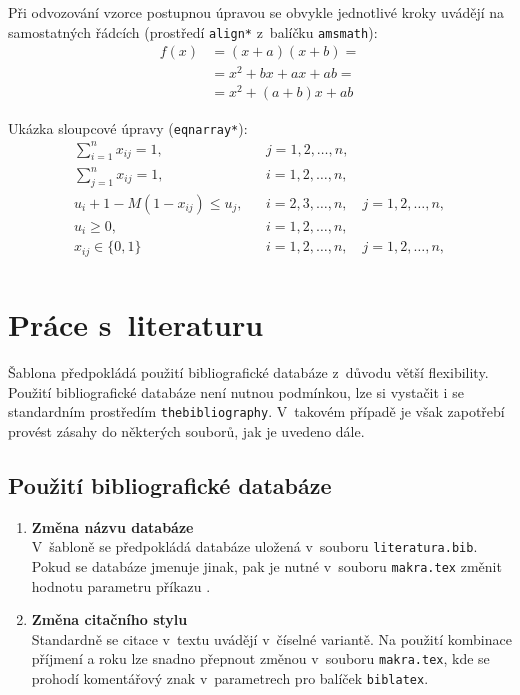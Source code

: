 Při odvozování vzorce postupnou úpravou se obvykle jednotlivé kroky uvádějí na samostatných řádcích (prostředí \verb'align*' z~balíčku \verb|amsmath|):
\begin{align*}
 f(x) &= (x+a)(x+b) =\\
      &= x^2 + bx + ax + ab =\\
      &= x^2 + (a+b)x + ab
\end{align*}

Ukázka sloupcové úpravy (\verb|eqnarray*|):
\begin{eqnarray*}
\sum_{i=1}^n x_{ij} =1, && j=1,2,\dots,n,\\
\sum_{j=1}^n x_{ij} =1, && i=1,2,\dots,n,\\
u_i + 1 - M(1 - x_{ij}) \le u_j, && i=2,3,\dots,n,\quad j=1,2,\dots,n,\\
u_i \ge 0,              && i=1,2,\dots,n,\\
x_{ij} \in \{0,1\} && i=1,2,\dots,n,\quad j=1,2,\dots,n,\\
\end{eqnarray*}


\chapter{Práce s~literaturu}

Šablona předpokládá použití bibliografické databáze z~důvodu větší flexibility. Použití bibliografické databáze není nutnou podmínkou, lze si vystačit i se standardním prostředím \texttt{thebibliography}. V~takovém případě je však zapotřebí provést zásahy do některých souborů, jak je uvedeno dále.

\section{Použití bibliografické databáze}

\begin{enumerate}
\item\textbf{Změna názvu databáze}\\
V~šabloně se předpokládá databáze uložená v~souboru \texttt{literatura.bib}. Pokud se databáze jmenuje jinak, pak je nutné v~souboru \texttt{makra.tex} změnit hodnotu parametru příkazu \verb''.
\item\textbf{Změna citačního stylu}\\
Standardně se citace v~textu uvádějí v~číselné variantě. Na použití kombinace příjmení a roku lze snadno přepnout změnou v~souboru \texttt{makra.tex}, kde se prohodí komentářový znak v~parametrech pro balíček \texttt{biblatex}.
\end{enumerate}


